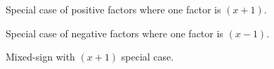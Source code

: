 \documentclass[12pt, a4paper, addpoints]{exam}
\newcommand{\ts}{\vspace{22 mm}}
\newcommand{\ms}{\vspace{33 mm}}
\begin{document}
\begin{questions}
\begin{mdframed}[backgroundcolor=gray!10]
\end{mdframed}





\question Special  case  of  positive factors where one factor  is \((x+1) \).


\begin{parts}\Large
{} \ms
\end{parts}

\ts

\question Special  case  of negative factors where one factor is \((x-1) \). 

\begin{multicols}{3}
\end{multicols}
\ts


\question Mixed-sign  with  \((x+1) \) special case. 
\begin{multicols}{3}
\begin{parts}\Large

\end{parts}
\end{multicols}
\end{questions}
\end{document}
